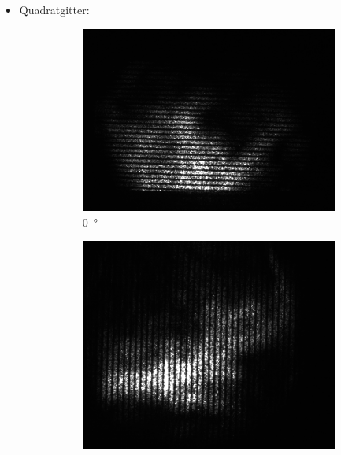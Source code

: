 \documentclass[
	a4paper,
	12pt,
	pagesize,
	ngerman
]{scrartcl}
\begin{document}
\begin{itemize}
	\item{Quadratgitter:}
	\begin{figure}[H]
        \centering
        \begin{subfigure}[b]{0.475\textwidth}
            \centering
            \includegraphics[width=\textwidth]{raw/4/4_quad_spaltsenkrecht_crop}
            \caption%
            {\SI{0}{\degree}}
            \label{fig_4_quad_0}
        \end{subfigure}
        \hfill
        \begin{subfigure}[b]{0.475\textwidth}
            \centering
            \includegraphics[width=\textwidth]{raw/4/4_quad_spaltwaagerecht_crop}

\end{subfigure}
\end{figure}
\end{itemize}
\end{document}
